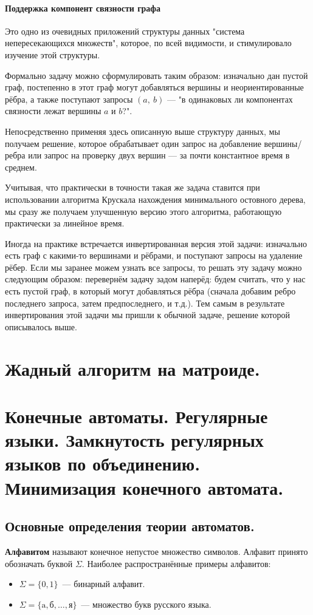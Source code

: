 \documentclass[a4paper,12pt]{article}
\begin{document}
\paragraph{Поддержка компонент связности графа}

Это одно из очевидных приложений структуры данных "система непересекающихся множеств", которое, по всей видимости, и стимулировало изучение этой структуры.

Формально задачу можно сформулировать таким образом: изначально дан пустой граф, постепенно в этот граф могут добавляться вершины и неориентированные рёбра, а также поступают запросы $(a,\ b)$ — "в одинаковых ли компонентах связности лежат вершины $a$ и $b$?".

Непосредственно применяя здесь описанную выше структуру данных, мы получаем решение, которое обрабатывает один запрос на добавление вершины/ребра или запрос на проверку двух вершин — за почти константное время в среднем.

Учитывая, что практически в точности такая же задача ставится при использовании алгоритма Крускала нахождения минимального остовного дерева, мы сразу же получаем улучшенную версию этого алгоритма, работающую практически за линейное время.

Иногда на практике встречается инвертированная версия этой задачи: изначально есть граф с какими-то вершинами и рёбрами, и поступают запросы на удаление рёбер. Если мы заранее можем узнать все запросы, то решать эту задачу можно следующим образом: перевернём задачу задом наперёд: будем считать, что у нас есть пустой граф, в который могут добавляться рёбра (сначала добавим ребро последнего запроса, затем предпоследнего, и т.д.). Тем самым в результате инвертирования этой задачи мы пришли к обычной задаче, решение которой описывалось выше.

\newpage
\section{Жадный алгоритм на матроиде.}


\newpage
\section{Конечные автоматы. Регулярные языки. Замкнутость регулярных языков по объединению. Минимизация конечного автомата.}
	 \subsection{Основные определения теории автоматов.}
	\textbf{Алфавитом} называют конечное непустое множество символов. Алфавит принято обозначать буквой $\Sigma$. Наиболее распространённые примеры алфавитов:
	\begin{itemize}
		\item $\Sigma = \{0, 1\}$~--- бинарный алфавит.
		\item $\Sigma = \{\text{a}, \text{б}, \ldots, \text{я}\}$~--- множество букв русского языка.
	\end{itemize}
	
\end{document}
